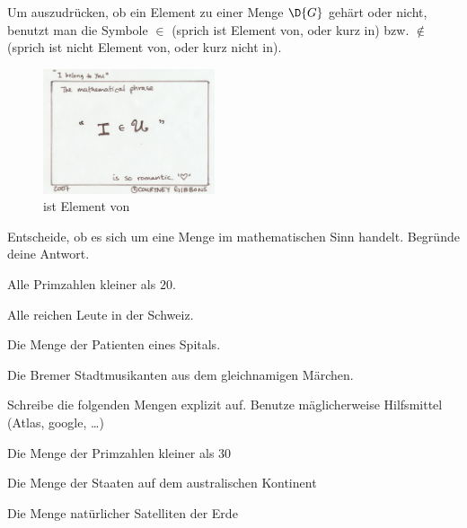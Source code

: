 \documentclass[%
11pt,%
twoside,%
titlepage,%
german,%
]{scrartcl}
\begin{document}
\begin{bem}
Um auszudr\"ucken, ob ein Element zu einer Menge $\D{G}$ geh\"art oder nicht, benutzt man die Symbole $\in$ (sprich \glqq ist Element von\grqq, oder kurz \glqq in\grqq) bzw. $\notin$ (sprich \glqq ist nicht Element von\grqq, oder kurz \glqq nicht in\grqq).
\end{bem}

\begin{figure}
\begin{center}
\includegraphics[width=0.45\textwidth]{pictures/belongsto}
\caption{\glqq ist Element von\grqq}
\end{center}
\end{figure}

\begin{ueb}
Entscheide, ob es sich um eine Menge im mathematischen Sinn handelt. Begr\"unde deine Antwort.
\begin{enumeratea}
\item Alle Primzahlen kleiner als $20$.
\item Alle reichen Leute in der Schweiz.
\item Die Menge der Patienten eines Spitals.
\item Die Bremer Stadtmusikanten aus dem gleichnamigen M\"archen.
\end{enumeratea}
\end{ueb}

\begin{ueb}[explizit]
Schreibe die folgenden Mengen explizit auf. Benutze m\"aglicherweise Hilfsmittel (Atlas, google, \dots)
\begin{enumeratea}
\item Die Menge der Primzahlen kleiner als $30$
\item Die Menge der Staaten auf dem australischen Kontinent
\item Die Menge nat\"urlicher Satelliten der Erde
\end{enumeratea}
\end{ueb}
\end{document}
